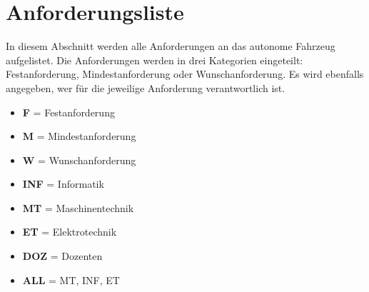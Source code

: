 \documentclass[../main.tex]{subfiles}
\begin{document}
\newpage
\section{Anforderungsliste}
\label{sec:anforderungsliste}

In diesem Abschnitt werden alle Anforderungen an das autonome Fahrzeug aufgelistet.  
Die Anforderungen werden in drei Kategorien eingeteilt: Festanforderung, Mindestanforderung oder Wunschanforderung.  
Es wird ebenfalls angegeben, wer für die jeweilige Anforderung verantwortlich ist.

\begin{multicols}{2}
\begin{itemize}
  \item {\bf F} = Festanforderung
  \item {\bf M} = Mindestanforderung
  \item {\bf W} = Wunschanforderung
\end{itemize}

\columnbreak

\begin{itemize}
  \item {\bf INF} = Informatik
  \item {\bf MT} = Maschinentechnik
  \item {\bf ET} = Elektrotechnik
  \item {\bf DOZ} = Dozenten
  \item {\bf ALL} = MT, INF, ET
\end{itemize}
\end{multicols}
\end{document}
